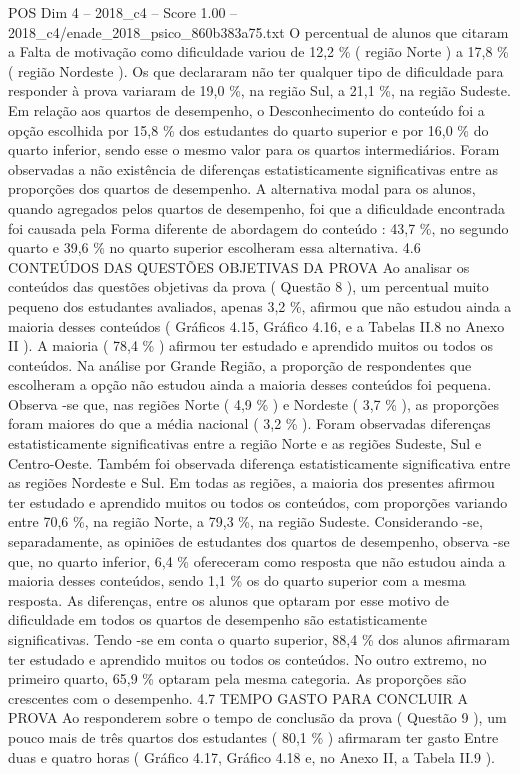 \begin{textsample}{POS Dim 4 – 2018\_c4 – Score 1.00 – 2018\_c4/enade\_2018\_psico\_860b383a75.txt}
O percentual de alunos que citaram a Falta de motivação como dificuldade variou de 12,2 \% ( região Norte ) a 17,8 \% ( região Nordeste ).
Os que declararam não ter qualquer tipo de dificuldade para responder à prova variaram de 19,0 \%, na região Sul, a 21,1 \%, na região Sudeste.
Em relação aos quartos de desempenho, o Desconhecimento do conteúdo foi a opção escolhida por 15,8 \% dos estudantes do quarto superior e por 16,0 \% do quarto inferior, sendo esse o mesmo valor para os quartos intermediários.
Foram observadas a não existência de diferenças estatisticamente significativas entre as proporções dos quartos de desempenho.
A alternativa modal para os alunos, quando agregados pelos quartos de desempenho, foi que a dificuldade encontrada foi causada pela Forma diferente de abordagem do conteúdo : 43,7 \%, no segundo quarto e 39,6 \% no quarto superior escolheram essa alternativa. 4.6 CONTEÚDOS DAS QUESTÕES OBJETIVAS DA PROVA Ao analisar os conteúdos das questões objetivas da prova ( Questão 8 ), um percentual muito pequeno dos estudantes avaliados, apenas 3,2 \%, afirmou que não estudou ainda a maioria desses conteúdos ( Gráficos 4.15, Gráfico 4.16, e a Tabelas II.8 no Anexo II ).
A maioria ( 78,4 \% ) afirmou ter estudado e aprendido muitos ou todos os conteúdos.
Na análise por Grande Região, a proporção de respondentes que escolheram a opção não estudou ainda a maioria desses conteúdos foi pequena.
Observa -se que, nas regiões Norte ( 4,9 \% ) e Nordeste ( 3,7 \% ), as proporções foram maiores do que a média nacional ( 3,2 \% ).
Foram observadas diferenças estatisticamente significativas entre a região Norte e as regiões Sudeste, Sul e Centro-Oeste.
Também foi observada diferença estatisticamente significativa entre as regiões Nordeste e Sul.
Em todas as regiões, a maioria dos presentes afirmou ter estudado e aprendido muitos ou todos os conteúdos, com proporções variando entre 70,6 \%, na região Norte, a 79,3 \%, na região Sudeste.
Considerando -se, separadamente, as opiniões de estudantes dos quartos de desempenho, observa -se que, no quarto inferior, 6,4 \% ofereceram como resposta que não estudou ainda a maioria desses conteúdos, sendo 1,1 \% os do quarto superior com a mesma resposta.
As diferenças, entre os alunos que optaram por esse motivo de dificuldade em todos os quartos de desempenho são estatisticamente significativas.
Tendo -se em conta o quarto superior, 88,4 \% dos alunos afirmaram ter estudado e aprendido muitos ou todos os conteúdos.
No outro extremo, no primeiro quarto, 65,9 \% optaram pela mesma categoria.
As proporções são crescentes com o desempenho. 4.7 TEMPO GASTO PARA CONCLUIR A PROVA Ao responderem sobre o tempo de conclusão da prova ( Questão 9 ), um pouco mais de três quartos dos estudantes ( 80,1 \% ) afirmaram ter gasto Entre duas e quatro horas ( Gráfico 4.17, Gráfico 4.18 e, no Anexo II, a Tabela II.9 ).

\end{textsample}
